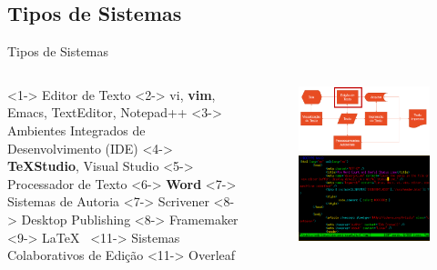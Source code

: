 \documentclass{beamer}
\begin{document}
\subsection{Tipos de Sistemas}
\begin{frame}[shrink=10]{Tipos de Sistemas}
    \begin{columns}
        \begin{column}{0.5\textwidth}
            \begin{outline}
                \1 <1-> Editor de Texto
                \2 <2-> vi, \textbf{vim}, Emacs, TextEditor, Notepad++
                \1 <3-> Ambientes Integrados de Desenvolvimento (IDE)      
                \2 <4-> \textbf{\TeX Studio}, Visual Studio
                \1 <5-> Processador de Texto 
                \2 <6-> \textbf{Word}
                \1 <7-> Sistemas de Autoria
                \2 <7-> Scrivener
                \1 <8-> Desktop Publishing
                \2 <8-> Framemaker
                \1 <9-> \LaTeX\
                \1 <11-> Sistemas Colaborativos de Edição
                \2 <11-> Overleaf
            \end{outline}
        \end{column}
        \begin{column}{0.5\textwidth}
            \begin{figure}
                \begin{overprint}
                        \includegraphics[width=0.8\linewidth]{Images/editordetexto.png}
                    \onslide<2>
                        \includegraphics[width=0.8\linewidth]{Images/vim.png}     

\end{overprint}
\end{figure}
\end{column}
\end{columns}
\end{frame}
\end{document}
